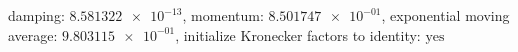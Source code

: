 damping: $\num[scientific-notation=true]{8.581322e-13}$, momentum: $\num[scientific-notation=true]{8.501747e-01}$, exponential moving average: $\num[scientific-notation=true]{9.803115e-01}$, initialize Kronecker factors to identity: $\text{yes}$